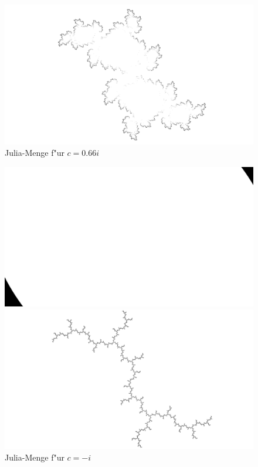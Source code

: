 \begin{refsection}
\begin{figure}
\begin{center}
\bigskip

\includegraphics[width=\hsize]{julia/j-g.png}
\end{center}
\caption{Julia-Menge f"ur $c= 0.66i$}
\end{figure}

\begin{figure}
\begin{center}
\includegraphics[width=\hsize]{julia/h.png}

\bigskip

\includegraphics[width=\hsize]{julia/j-h.png}
\end{center}
\caption{Julia-Menge f"ur $c= -i$}
\end{figure}

\printbibliography[heading=subbibliography]
\end{refsection}
